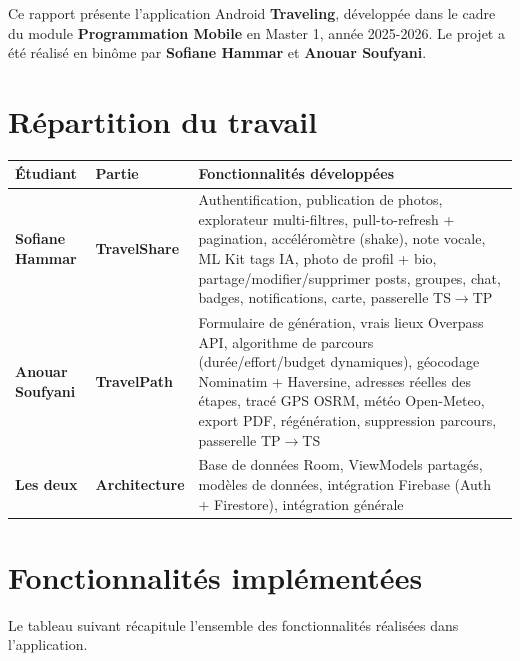 \documentclass[a4paper,12pt,openany]{report}
\begin{document}
Ce rapport présente l'application Android \textbf{Traveling}, développée dans le cadre du module
\textbf{Programmation Mobile} en Master 1, année 2025-2026. Le projet a été réalisé en
binôme par \textbf{Sofiane Hammar} et \textbf{Anouar Soufyani}.

\section{Répartition du travail}

\begin{tabularx}{\textwidth}{>{\bfseries}l >{\bfseries}l X}
  \toprule
  Étudiant & Partie & Fonctionnalités développées \\
  \midrule
  Sofiane Hammar
    & TravelShare
    & Authentification, publication de photos, explorateur multi-filtres,
      pull-to-refresh + pagination, accéléromètre (shake), note vocale,
      ML Kit tags IA, photo de profil + bio, partage/modifier/supprimer posts,
      groupes, chat, badges, notifications, carte, passerelle TS$\to$TP \\[4pt]
  Anouar Soufyani
    & TravelPath
    & Formulaire de génération, vrais lieux Overpass API, algorithme de parcours
      (durée/effort/budget dynamiques), géocodage Nominatim + Haversine,
      adresses réelles des étapes, tracé GPS OSRM, météo Open-Meteo,
      export PDF, régénération, suppression parcours, passerelle TP$\to$TS \\[4pt]
  Les deux
    & Architecture
    & Base de données Room, ViewModels partagés, modèles de données, intégration
      Firebase (Auth + Firestore), intégration générale \\
  \bottomrule
\end{tabularx}

\section{Fonctionnalités implémentées}

Le tableau suivant récapitule l'ensemble des fonctionnalités réalisées dans
l'application.
\end{document}
